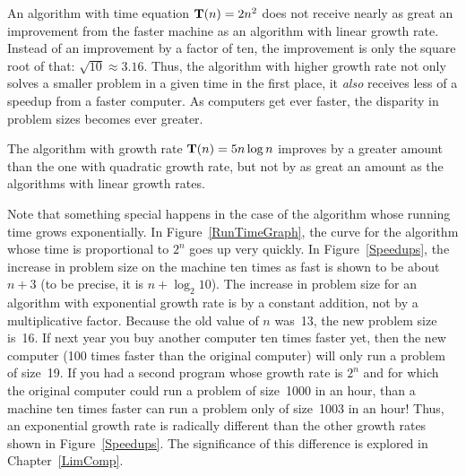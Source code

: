 An algorithm with time equation \(\mbox{$\textbf{T}(n)$} = 2n^2\) does not receive nearly
as great an improvement from the faster machine as an algorithm with
linear growth rate.
Instead of an improvement by a factor of ten, the improvement
is only the square root of that: \(\sqrt{10} \approx 3.16\).
Thus, the algorithm with higher growth rate not only solves a smaller
problem in a given time in the first place, it \emph{also}
receives less of a speedup from a faster computer.
As computers get ever faster, the disparity in problem sizes becomes
ever greater.

The algorithm with growth rate \(\mbox{$\textbf{T}(n)$} = 5 n \log n\) improves by a
greater amount than the one with quadratic growth rate, but not
by as great an amount as the algorithms with linear growth rates.

Note that something special happens in the case of the
algorithm whose running time grows exponentially.
In Figure~\ref{RunTimeGraph}, the curve for the algorithm whose time
is proportional to \(2^n\) goes up very quickly.
In Figure~\ref{Speedups}, the increase in problem size on the machine
ten times as fast is shown to be about \(n + 3\)
(to be precise, it is \(n + \log_2 10\)).
The increase in problem size for an algorithm with exponential growth
rate is by a constant addition, not by a multiplicative factor.
Because the old value of \(n\) was~13, the new problem size is~16.
If next year you buy another computer ten times faster yet, then the
new computer (100 times faster than the original computer) will only
run a problem of size~19.
If you had a second program whose growth rate is \(2^n\) and for which
the original computer could run a problem of size~1000 in an hour,
than a machine ten times faster can run a problem only of size~1003 in
an hour!
Thus, an exponential growth rate is radically different than the
other growth rates shown in Figure~\ref{Speedups}.
The significance of this difference is explored in
Chapter~\ref{LimComp}.

